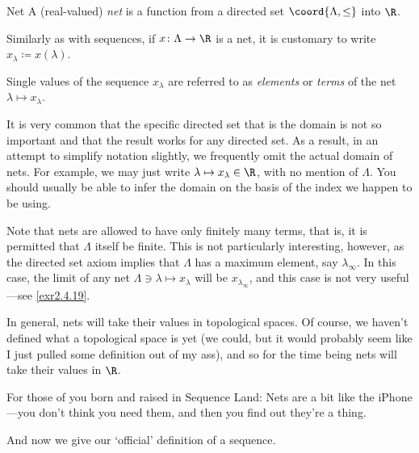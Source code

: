 \begin{dfn}{Net}{}
A (real-valued) \emph{net} is a function from a directed set $\coord{\Lambda ,\leq}$ into $\R$.
\begin{rmk}
Similarly as with sequences, if $x\colon \Lambda \rightarrow \R$ is a net, it is customary to write $x_\lambda \coloneqq x(\lambda )$.
\end{rmk}
\begin{rmk}
Single values of the sequence $x_{\lambda}$ are referred to as \emph{elements} or \emph{terms} of the net $\lambda \mapsto x_{\lambda}$.
\end{rmk}
\begin{rmk}
It is very common that the specific directed set that is the domain is not so important and that the result works for any directed set.  As a result, in an attempt to simplify notation slightly, we frequently omit the actual domain of nets.  For example, we may just write $\lambda \mapsto x_{\lambda}\in \R$, with no mention of $\Lambda$.  You should usually be able to infer the domain on the basis of the index we happen to be using.
\end{rmk}
\begin{rmk}
Note that nets are allowed to have only finitely many terms, that is, it is permitted that $\Lambda$ itself be finite.  This is not particularly interesting, however, as the directed set axiom implies that $\Lambda$ has a maximum element, say $\lambda_{\infty}$.  In this case, the limit of any net $\Lambda \ni \lambda \mapsto x_{\lambda}$ will be $x_{\lambda _{\infty}}$, and this case is not very useful---see \cref{exr2.4.19}.
\end{rmk}
\begin{rmk}
In general, nets will take their values in topological spaces.  Of course, we haven't defined what a topological space is yet (we could, but it would probably seem like I just pulled some definition out of my ass), and so for the time being nets will take their values in $\R$.
\end{rmk}
\begin{rmk}
For those of you born and raised in Sequence Land:  Nets are a bit like the iPhone---you don't think you need them, and then you find out they're a thing.
\end{rmk}
\end{dfn}
And now we give our `official' definition of a sequence.
